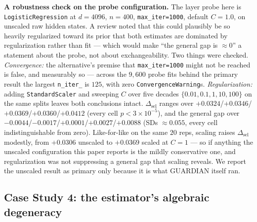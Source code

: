 \documentclass[10pt]{article} %
\begin{document}
\textbf{A robustness check on the probe configuration.} The layer probe here
is \texttt{LogisticRegression} at $d=4096$, $n=400$, \texttt{max\_iter=1000},
default $C=1.0$, on unscaled raw hidden states. A review noted that this
could plausibly be so heavily regularized toward its prior that both
estimates are dominated by regularization rather than fit --- which would
make ``the general gap is $\approx0$'' a statement about the probe, not
about exchangeability. Two things were checked. \emph{Convergence:} the
alternative's premise that \texttt{max\_iter=1000} might not be reached is
false, and measurably so --- across the $9{,}600$ probe fits behind the
primary result the largest \texttt{n\_iter\_} is $125$, with zero
\texttt{ConvergenceWarning}s. \emph{Regularization:} adding
\texttt{StandardScaler} and sweeping $C$ over five decades
$\{0.01,0.1,1,10,100\}$ on the same splits leaves both conclusions intact.
$\Delta_{\text{sel}}$ ranges over
$+0.0324$/$+0.0346$/$+0.0369$/$+0.0360$/$+0.0412$ (every cell $p<3\times
10^{-5}$), and the general gap over
$-0.0044$/$-0.0017$/$+0.0001$/$+0.0027$/$+0.0088$ (SDs $\approx0.055$, every
cell indistinguishable from zero). Like-for-like on the same $20$ reps,
scaling raises $\Delta_{\text{sel}}$ modestly, from $+0.0306$ unscaled to
$+0.0369$ scaled at $C=1$ --- so if anything the unscaled configuration this
paper reports is the mildly conservative one, and regularization was not
suppressing a general gap that scaling reveals. We report the unscaled
result as primary only because it is what GUARDIAN itself ran.

\subsection{Case Study 4: the estimator's algebraic degeneracy}
\end{document}
